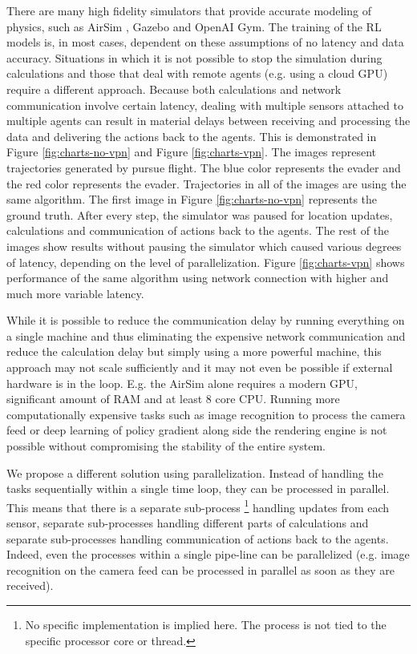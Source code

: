 \documentclass{article}
\begin{document}
There are many high fidelity simulators that provide accurate modeling of physics, such as AirSim \cite{shah2018airsim}, Gazebo and OpenAI Gym. The training of the RL models is, in most cases, dependent on these assumptions of no latency and data accuracy. Situations in which it is not possible to stop the simulation during calculations and those that deal with remote agents (e.g. using a cloud GPU) require a different approach. Because both calculations and network communication involve certain latency, dealing with multiple sensors attached to multiple agents can result in material delays between receiving and processing the data and delivering the actions back to the agents. This is demonstrated in Figure \ref{fig:charts-no-vpn} and Figure \ref{fig:charts-vpn}. The images represent trajectories generated by pursue flight. The blue color represents the evader and the red color represents the evader. Trajectories in all of the images are using the same algorithm. The first image in Figure \ref{fig:charts-no-vpn} represents the ground truth. After every step, the simulator was paused for location updates, calculations and communication of actions back to the agents. The rest of the images show results without pausing the simulator which caused various degrees of latency, depending on the level of parallelization. Figure \ref{fig:charts-vpn} shows performance of the same algorithm using network connection with higher and much more variable latency.

While it is possible to reduce the communication delay by running everything on a single machine and thus eliminating the expensive network communication and reduce the calculation delay but simply using a more powerful machine, this approach may not scale sufficiently and it may not even be possible if external hardware is in the loop. E.g. the AirSim alone requires a modern GPU, significant amount of RAM and at least 8 core CPU. Running more computationally expensive tasks such as image recognition to process the camera feed or deep learning of policy gradient along side the rendering engine is not possible without compromising the stability of the entire system.

We propose a different solution using parallelization. Instead of handling the tasks sequentially within a single time loop, they can be processed in parallel. This means that there is a separate sub-process \footnote{No specific implementation is implied here. The process is not tied to the specific processor core or thread.} handling updates from each sensor, separate sub-processes handling different parts of calculations and separate sub-processes handling communication of actions back to the agents. Indeed, even the processes within a single pipe-line can be parallelized (e.g. image recognition on the camera feed can be processed in parallel as soon as they are received).
\end{document}
